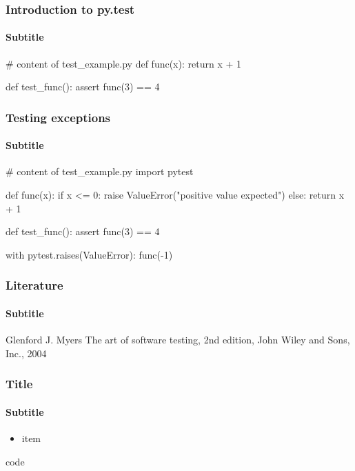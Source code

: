 \documentclass{beamer}
\begin{document}
\begin{frame}[fragile]
    \frametitle{Introduction to py.test}
    \framesubtitle{Subtitle}

    \begin{python}
# content of test_example.py
def func(x):
    return x + 1

def test_func():
    assert func(3) == 4
    \end{python}
\end{frame}

\begin{frame}[fragile]
    \frametitle{Testing exceptions}
    \framesubtitle{Subtitle}

    \begin{python}
# content of test_example.py
import pytest

def func(x):
    if x <= 0:
        raise ValueError("positive value expected")
    else:
        return x + 1

def test_func():
    assert func(3) == 4

    with pytest.raises(ValueError):
        func(-1)
    \end{python}
\end{frame}

\begin{frame}[fragile]
    \frametitle{Literature}
    \framesubtitle{Subtitle}

    Glenford J. Myers
    The art of software testing, 2nd edition,
    John Wiley and Sons, Inc., 2004
\end{frame}

\begin{frame}[fragile]
    \frametitle{Title}
    \framesubtitle{Subtitle}

    \begin{itemize}
        \item item
    \end{itemize}
    \pause
    \begin{python}
    code
    \end{python}
\end{frame}

\end{document}
